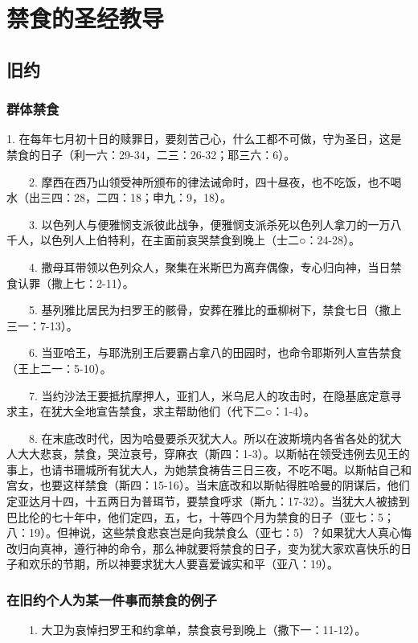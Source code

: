 \chapter{禁食的圣经教导}
\section{旧约}
\subsection{群体禁食}
1. 在每年七月初十日的赎罪日，要刻苦己心，什么工都不可做，守为圣日，这是禁食的日子（利一六：29-34，二三：26-32；耶三六：6）。

　　2. 摩西在西乃山领受神所颁布的律法诫命时，四十昼夜，也不吃饭，也不喝水（出三四：28，二四：18；申九：9，18）。

　　3. 以色列人与便雅悯支派彼此战争，便雅悯支派杀死以色列人拿刀的一万八千人，以色列人上伯特利，在主面前哀哭禁食到晚上（士二○：24-28）。

　　4. 撒母耳带领以色列众人，聚集在米斯巴为离弃偶像，专心归向神，当日禁食认罪（撒上七：2-11）。

　　5. 基列雅比居民为扫罗王的骸骨，安葬在雅比的垂柳树下，禁食七日（撒上三一：7-13）。　

　　6. 当亚哈王，与耶洗别王后要霸占拿八的田园时，也命令耶斯列人宣告禁食（王上二一：5-10）。

　　7. 当约沙法王要抵抗摩押人，亚扪人，米乌尼人的攻击时，在隐基底定意寻求主，在犹大全地宣告禁食，求主帮助他们（代下二○：1-4）。

　　8. 在末底改时代，因为哈曼要杀灭犹大人。所以在波斯境内各省各处的犹大人大大悲哀，禁食，哭泣哀号，穿麻衣（斯四：1-3）。以斯帖在领受违例去见王的事上，也请书珊城所有犹大人，为她禁食祷告三日三夜，不吃不喝。以斯帖自己和宫女，也要这样禁食（斯四：15-16）。当末底改和以斯帖得胜哈曼的阴谋后，他们定亚达月十四，十五两日为普珥节，要禁食呼求（斯九：17-32）。当犹大人被掳到巴比伦的七十年中，他们定四，五，七，十等四个月为禁食的日子（亚七：5；八：19）。但神说，这些禁食悲哀岂是向我禁食么（亚七：5）？如果犹大人真心悔改归向真神，遵行神的命令，那么神就要将禁食的日子，变为犹大家欢喜快乐的日子和欢乐的节期，所以神要求犹大人要喜爱诚实和平（亚八：19）。

\subsection{在旧约个人为某一件事而禁食的例子}

　　1. 大卫为哀悼扫罗王和约拿单，禁食哀号到晚上（撒下一：11-12）。


